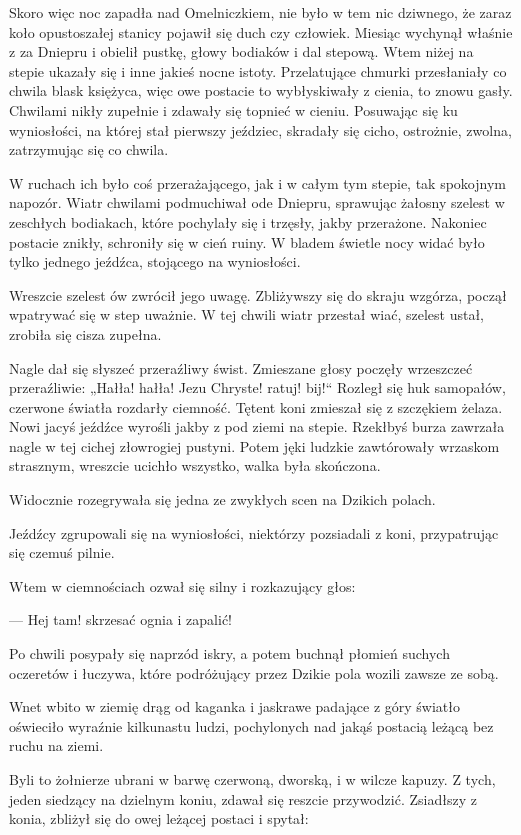 Skoro więc noc zapadła nad Omelniczkiem, nie było w tem nic dziwnego, że zaraz koło opustoszałej stanicy pojawił się duch czy człowiek. Miesiąc wychynął właśnie z za Dniepru i obielił pustkę, głowy bodiaków i dal stepową. Wtem niżej na stepie ukazały się i inne jakieś nocne istoty. Przelatujące chmurki przesłaniały co chwila blask księżyca, więc owe postacie to wybłyskiwały z cienia, to znowu gasły. Chwilami nikły zupełnie i zdawały się topnieć w cieniu. Posuwając się ku wyniosłości, na której stał pierwszy jeździec, skradały się cicho, ostrożnie, zwolna, zatrzymując się co chwila.

W ruchach ich było coś przerażającego, jak i w całym tym stepie, tak spokojnym napozór. Wiatr chwilami podmuchiwał ode Dniepru, sprawując żałosny szelest w zeschłych bodiakach, które pochylały się i trzęsły, jakby przerażone. Nakoniec postacie znikły, schroniły się w cień ruiny. W bladem świetle nocy widać było tylko jednego jeźdźca, stojącego na wyniosłości.

Wreszcie szelest ów zwrócił jego uwagę. Zbliżywszy się do skraju wzgórza, począł wpatrywać się w step uważnie. W tej chwili wiatr przestał wiać, szelest ustał, zrobiła się cisza zupełna.

Nagle dał się słyszeć przeraźliwy świst. Zmieszane głosy poczęły wrzeszczeć przeraźliwie: „Hałła! hałła! Jezu Chryste! ratuj! bij!“ Rozległ się huk samopałów, czerwone światła rozdarły ciemność. Tętent koni zmieszał się z szczękiem żelaza. Nowi jacyś jeźdźce wyrośli jakby z pod ziemi na stepie. Rzekłbyś burza zawrzała nagle w tej cichej złowrogiej pustyni. Potem jęki ludzkie zawtórowały wrzaskom strasznym, wreszcie ucichło wszystko, walka była skończona.

Widocznie rozegrywała się jedna ze zwykłych scen na Dzikich polach.

Jeźdźcy zgrupowali się na wyniosłości, niektórzy pozsiadali z koni, przypatrując się czemuś pilnie.

Wtem w ciemnościach ozwał się silny i rozkazujący głos:

— Hej tam! skrzesać ognia i zapalić!

Po chwili posypały się naprzód iskry, a potem buchnął płomień suchych oczeretów i łuczywa, które podróżujący przez Dzikie pola wozili zawsze ze sobą.

Wnet wbito w ziemię drąg od kaganka i jaskrawe padające z góry światło oświeciło wyraźnie kilkunastu ludzi, pochylonych nad jakąś postacią leżącą bez ruchu na ziemi.

Byli to żołnierze ubrani w barwę czerwoną, dworską, i w wilcze kapuzy. Z tych, jeden siedzący na dzielnym koniu, zdawał się reszcie przywodzić. Zsiadłszy z konia, zbliżył się do owej leżącej postaci i spytał:

